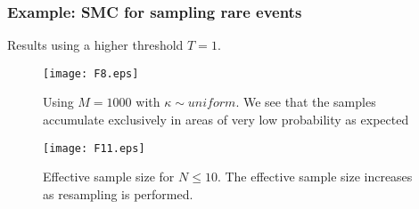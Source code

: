 \documentclass[aspectratio=169]{beamer}\usepackage[utf8]{inputenc}
\begin{document}
\begin{frame}\frametitle{Example: SMC for sampling rare events  }
Results using  a higher threshold $T=1$.
\begin{figure}[h!]
	\centering
	\begin{minipage}{.45\textwidth}
		\centering
		\texttt{[image: F8.eps]}
		\caption{Using $M=1000$ with  $ \kappa \sim uniform $. We see that the samples accumulate exclusively  in  areas of very low probability as expected     }
		\label{Ex1}
	\end{minipage}%
	\begin{minipage}{.05\textwidth}
	\end{minipage}
	\begin{minipage}{.45\textwidth}
		\centering
		\texttt{[image: F11.eps]}
		\caption{Effective sample size for $N\leq 10$. The effective sample size  increases as resampling is performed.  }
		\label{Ex2}
	\end{minipage}
\end{figure}
\end{frame}
\end{document}
